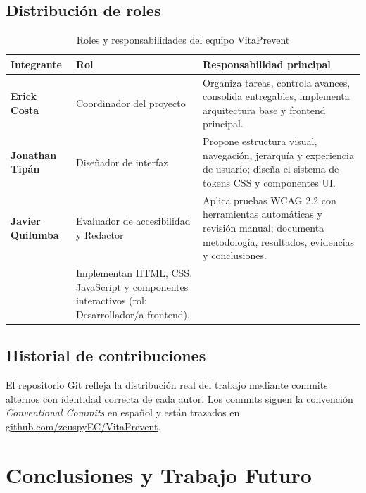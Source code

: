 \documentclass[12pt, a4paper]{report}
\begin{document}
\section{Distribución de roles}

\begin{table}[H]
\centering
\caption{Roles y responsabilidades del equipo VitaPrevent}
\label{tab:roles}
\begin{tabular}{@{}>{\bfseries}p{3.5cm} p{4cm} p{6.5cm}@{}}
\toprule
\rowcolor{royalblue!12}
\textbf{Integrante} & \textbf{Rol} & \textbf{Responsabilidad principal} \\
\midrule
Erick Costa &
  Coordinador del proyecto &
  Organiza tareas, controla avances, consolida entregables, implementa arquitectura base y frontend principal. \\
Jonathan Tipán &
  Diseñador de interfaz &
  Propone estructura visual, navegación, jerarquía y experiencia de usuario; diseña el sistema de tokens CSS y componentes UI. \\
Javier Quilumba &
  Evaluador de accesibilidad y Redactor &
  Aplica pruebas WCAG 2.2 con herramientas automáticas y revisión manual; documenta metodología, resultados, evidencias y conclusiones. \\
\midrule
\multicolumn{2}{@{}>{\bfseries}l}{Todos los integrantes} &
  Implementan HTML, CSS, JavaScript y componentes interactivos (rol: Desarrollador/a frontend). \\
\bottomrule
\end{tabular}
\end{table}

\section{Historial de contribuciones}

El repositorio Git refleja la distribución real del trabajo mediante commits alternos con identidad correcta de cada autor. Los commits siguen la convención \textit{Conventional Commits} en español y están trazados en \href{https://github.com/zeuspyEC/VitaPrevent}{github.com/zeuspyEC/VitaPrevent}.

\chapter{Conclusiones y Trabajo Futuro}
\end{document}
